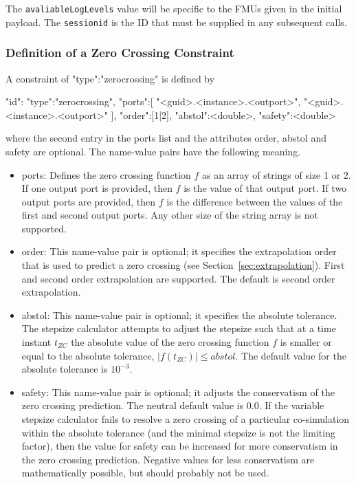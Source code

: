 The \texttt{avaliableLogLevels} value will be specific to the FMUs given in the initial payload. The \texttt{sessionid} is the ID that must be supplied in any subsequent calls.
%
%
%
\subsubsection{Definition of a Zero Crossing Constraint}\label{sec:defzcconstraint}
A constraint of {\ttfamily "type":"zerocrossing"} is defined by

\begin{json}
	"id":{
		"type":"zerocrossing",
		"ports":[
		"<guid>.<instance>.<outport>",
		"<guid>.<instance>.<outport>"
		],
		"order":[1|2],
		"abstol":<double>,
		"safety":<double>
	}
\end{json}

\noindent where the second entry in the {\ttfamily ports} list and the attributes {\ttfamily order}, {\ttfamily abstol} and {\ttfamily safety} are optional. The name-value pairs have the following meaning.

\begin{itemize}
	\item {\ttfamily ports:} Defines the zero crossing function $f$ as an array of strings of size 1 or 2. If one output port is provided, then $f$ is the value of that output port. If two output ports are provided, then $f$ is the difference between the values of the first and second output ports. Any other size of the string array is not supported.
	\item {\ttfamily order:} This name-value pair is optional; it specifies the extrapolation order that is used to predict a zero crossing (see Section~\ref{sec:extrapolation}). First and second order extrapolation are supported. The default is second order extrapolation.
	\item {\ttfamily abstol:} This name-value pair is optional; it specifies the absolute tolerance. The stepsize calculator attempts to adjust the stepsize such that at a time instant $t_{ZC}$ the absolute value of the zero crossing function $f$ is smaller or equal to the absolute tolerance, $\left|f(t_{ZC})\right| \leq abstol$. The default value for the absolute tolerance is $10^{-3}$.
	\item {\ttfamily safety:} This name-value pair is optional; it adjusts the conservatism of the zero crossing prediction. The neutral default value is 0.0. If the variable stepsize calculator fails to resolve a zero crossing of a particular co-simulation within the absolute tolerance (and the minimal stepsize is not the limiting factor), then the value for {\ttfamily safety} can be increased for more conservatism in the zero crossing prediction. Negative values for less conservatism are mathematically possible, but should probably not be used.
	\end {itemize}

